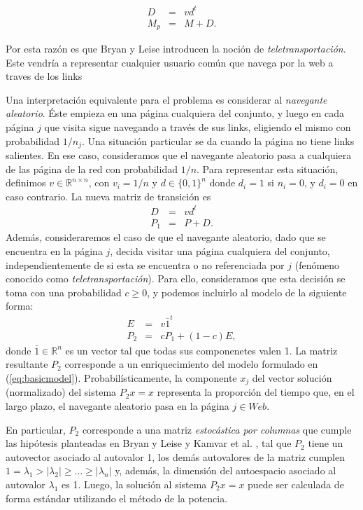 \begin{eqnarray*}
D & = & v d^t \\
M_p & = & M + D.
\end{eqnarray*}
 

 Por esta razón es que Bryan y Leise \cite{Bryan2006} introducen la noción de \emph{teletransportación}. Este vendría a representar cualquier usuario común que navega por la web a traves de los links 


Una interpretaci\'on equivalente para el problema es considerar al \emph{navegante aleatorio}. \'Este empieza en una
p\'agina cualquiera del conjunto, y luego en cada p\'agina $j$ que visita sigue navegando a trav\'es de sus links,
eligiendo el mismo con probabilidad $1/n_j$. Una situaci\'on particular se da cuando la p\'agina no tiene links salientes. En
ese caso, consideramos que el navegante aleatorio pasa a cualquiera de las p\'agina de la red con probabilidad $1/n$.
Para representar esta situaci\'on, definimos $v \in \mathbb{R}^{n \times n}$, con $v_i = 1/n$ y $d \in \{0,1\}^{n}$ donde 
$d_i = 1$ si $n_i = 0$, y $d_i = 0$ en caso contrario. La nueva matriz de transici\'on es 
\begin{eqnarray*}
D & = & v d^t \\
P_1 & = & P + D.
\end{eqnarray*}
Adem\'as, consideraremos el caso de que el navegante aleatorio, dado que se encuentra en la p\'agina $j$, decida visitar
una p\'agina cualquiera del conjunto, independientemente de si esta se encuentra o no referenciada por $j$ (fen\'omeno
conocido como \emph{teletransportaci\'on}). Para ello, consideramos que esta decisi\'on se toma con una probabilidad
$c \ge 0$, y podemos incluirlo al modelo de la siguiente forma:
\begin{eqnarray*}
E & = & v \bar{1}^t \\
P_2 & = & cP_1 + (1-c)E,
\end{eqnarray*}
\noindent donde $\bar{1} \in \mathbb{R}^n$ es un vector tal que todas sus componenetes valen 1. La matriz resultante
$P_2$ corresponde a un enriquecimiento del modelo formulado en (\ref{eq:basicmodel}). Probabil\'isticamente, la
componente $x_j$ del vector soluci\'on (normalizado) del sistema $P_2 x = x$ representa la proporci\'on del tiempo que,
en el largo plazo, el navegante aleatorio pasa en la p\'agina $j \in Web$.

En particular, $P_2$ corresponde a una
matriz \emph{estoc\'astica por columnas} que cumple las hip\'otesis planteadas en Bryan y Leise \cite{Bryan2006} y
Kamvar et al. \cite{Kamvar2003}, tal que $P_2$ tiene un autovector asociado al autovalor 1, los dem\'as autovalores de
la matriz cumplen $1 = \lambda_1 > |\lambda_2| \ge \dots \ge |\lambda_n|$ y, adem\'as, la dimensi\'on
del autoespacio asociado al autovalor $\lambda_1$ es 1. Luego, la soluci\'on al sistema $P_2 x = x$ puede ser calculada
de forma est\'andar utilizando el m\'etodo de la potencia.

